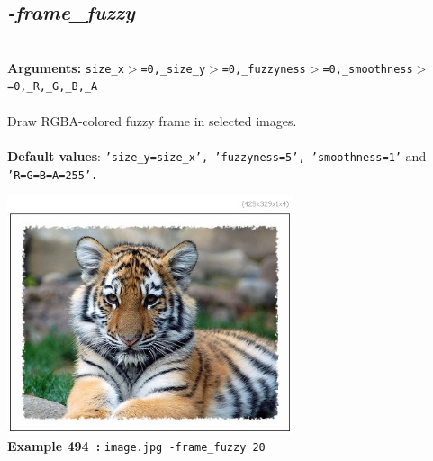 \documentclass[a4paper,11pt,twoside]{book}
\begin{document}
\subsection{\emph{-frame\_fuzzy} }\vspace*{-0.5em}
~\\\textbf{Arguments: } 
{\small \texttt{size\_x$>$=0,\_size\_y$>$=0,\_fuzzyness$>$=0,\_smoothness$>$=0,\_R,\_G,\_B,\_A}}\\~\\
Draw RGBA-colored fuzzy frame in selected images.
~\\~\\\textbf{Default values}: {\small \texttt{'size\_y=size\_x', 'fuzzyness=5', 'smoothness=1'} and \texttt{'R=G=B=A=255'.}}
\begin{center}\includegraphics[keepaspectratio=true,height=7cm,width=\textwidth]{img/gmic_def494.jpg}\\
{\footnotesize \textbf{Example 494~:} \texttt{image.jpg -frame\_fuzzy 20}}
\end{center}
\end{document}
